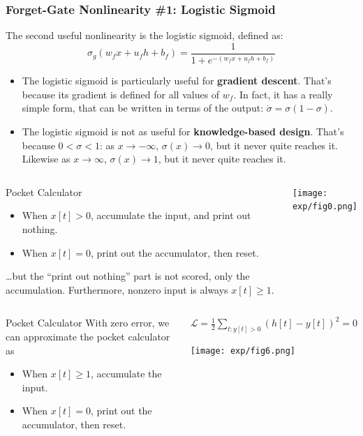 \documentclass{beamer}
\begin{document}
\begin{frame}
  \frametitle{Forget-Gate Nonlinearity \#1: Logistic Sigmoid}

  The second useful nonlinearity is the logistic sigmoid, defined as:
  \[
  \sigma_g(w_fx+u_fh+b_f) = \frac{1}{1+e^{-(w_fx+u_fh+b_f)}}
  \]
  \begin{itemize}
  \item The logistic sigmoid is particularly useful for {\bf gradient
    descent}.  That's because its gradient is defined for all values
    of $w_f$.  In fact, it has a really simple form, that can be
    written in terms of the output: $\dot\sigma=\sigma(1-\sigma)$.
  \item The logistic sigmoid is not as useful for {\bf knowledge-based
    design}.  That's because $0<\sigma<1$: as $x\rightarrow -\infty$,
    $\sigma(x)\rightarrow 0$, but it never quite reaches it.  Likewise
    as $x\rightarrow\infty$, $\sigma(x)\rightarrow 1$, but it never
    quite reaches it.
  \end{itemize}
\end{frame}
\begin{frame}
  \begin{columns}
    \column{2in}
    \begin{block}{Pocket Calculator}
      \begin{itemize}
        \item When $x[t]>0$, accumulate the input, and print out
          nothing.
        \item When $x[t]=0$, print out the accumulator, then reset.
      \end{itemize}
      \ldots but the ``print out nothing'' part is not scored, only
      the accumulation.  Furthermore, nonzero input is always $x[t]\ge
      1$.
    \end{block}
    \column{2.5in}
    \begin{block}{}
      \centerline{\texttt{[image: exp/fig0.png]}}
    \end{block}
    \end{columns}
\end{frame}
\begin{frame}
  \begin{columns}
    \column{2in}
    \begin{block}{Pocket Calculator}
      With zero error, we can approximate the pocket calculator as
      \begin{itemize}
        \item When $x[t]\ge 1$, accumulate the input.
        \item When $x[t]=0$, print out the accumulator, then reset.
      \end{itemize}
    \end{block}
    \column{2.5in}
    \begin{block}{${\mathcal L}=\frac{1}{2}\sum_{t:y[t]>0} \left(h[t]-y[t]\right)^2=0$}
      \centerline{\texttt{[image: exp/fig6.png]}}
    \end{block}
    \end{columns}
\end{frame}
\end{document}
